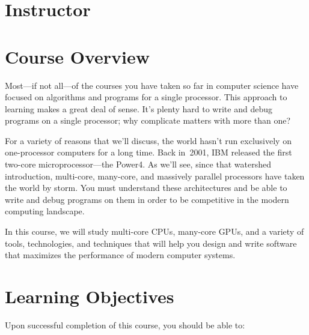 \documentclass[11pt]{article}
\begin{document}
\section{Instructor}



\section{Course Overview}

Most---if not all---of the courses
you have taken so far in computer science
have focused on algorithms and programs
for a single processor.
This approach to learning makes a great deal of sense.
It's plenty hard to write and debug programs
on a single processor;
why complicate matters with more than one?

For a variety of reasons that we'll discuss,
the world hasn't run exclusively on one-processor computers
for a long time.
Back in~2001, IBM released the first
two-core microprocessor---the Power4.\cite{ibm-power4}
As we'll see,
since that watershed introduction,
multi-core, many-core, and massively parallel processors
have taken the world by storm.
You must understand these architectures
and be able to write and debug programs on them
in order to be competitive in the modern computing landscape.

In this course,
we will study
multi-core CPUs,
many-core GPUs,
and a variety of tools, technologies, and techniques
that will help you
design and write software
that maximizes the performance of modern computer systems.

\section{Learning Objectives}

Upon successful completion of this course, you should be able to:
\end{document}
